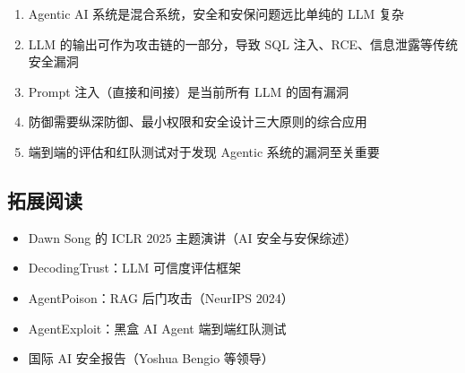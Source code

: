 \documentclass[a4paper]{article}
\begin{document}
\begin{enumerate}
    \item Agentic AI 系统是混合系统，安全和安保问题远比单纯的 LLM 复杂
    \item LLM 的输出可作为攻击链的一部分，导致 SQL 注入、RCE、信息泄露等传统安全漏洞
    \item Prompt 注入（直接和间接）是当前所有 LLM 的固有漏洞
    \item 防御需要纵深防御、最小权限和安全设计三大原则的综合应用
    \item 端到端的评估和红队测试对于发现 Agentic 系统的漏洞至关重要
\end{enumerate}

\subsection{拓展阅读}
\begin{itemize}
    \item Dawn Song 的 ICLR 2025 主题演讲（AI 安全与安保综述）
    \item DecodingTrust：LLM 可信度评估框架
    \item AgentPoison：RAG 后门攻击（NeurIPS 2024）
    \item AgentExploit：黑盒 AI Agent 端到端红队测试
    \item 国际 AI 安全报告（Yoshua Bengio 等领导）
\end{itemize}

\end{document}
